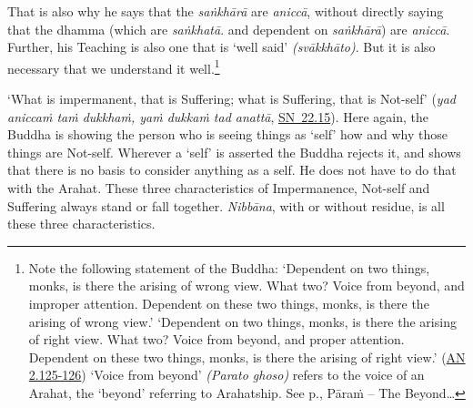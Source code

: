 That is also why he says that the \emph{saṅkhārā} are \emph{aniccā}, without directly saying that the dhamma (which are \emph{saṅkhatā}. and dependent on \emph{saṅkhārā}) are \emph{aniccā}. Further, his Teaching is also one that is `well said' \emph{(svākkhāto)}. But it is also necessary that we understand it well.\footnote{Note the following statement of the Buddha: `Dependent on two things, monks, is there the arising of wrong view. What two? Voice from beyond, and improper attention. Dependent on these two things, monks, is there the arising of wrong view.' `Dependent on two things, monks, is there the arising of right view. What two? Voice from beyond, and proper attention. Dependent on these two things, monks, is there the arising of right view.' (\href{https://suttacentral.net/an2.118-129/en/sujato}{AN 2.125-126}) `Voice from beyond' \emph{(Parato ghoso)} refers to the voice of an Arahat, the `beyond' referring to Arahatship. See p.\pageref{ch-13-beyond}, Pāraṁ -- The Beyond\ldots{}}

`What is impermanent, that is Suffering; what is Suffering, that is Not-self' (\emph{yad aniccaṁ taṁ dukkhaṁ, yaṁ dukkaṁ tad anattā}, \href{https://suttacentral.net/sn22.15/en/bodhi}{SN~22.15}). Here again, the Buddha is showing the person who is seeing things as `self' how and why those things are Not-self. Wherever a `self' is asserted the Buddha rejects it, and shows that there is no basis to consider anything as a self. He does not have to do that with the Arahat. These three characteristics of Impermanence, Not-self and Suffering always stand or fall together. \emph{Nibbāna}, with or without residue, is  all these three characteristics.
